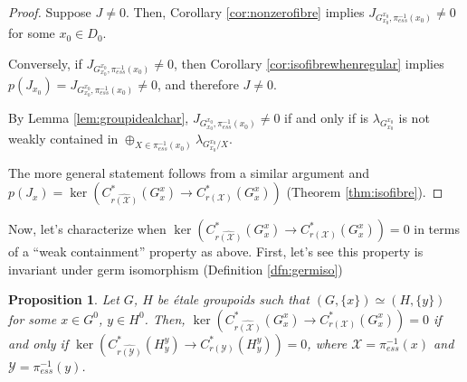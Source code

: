 \documentclass[a4paper, 12pt]{amsart}
\newtheorem{prp}[thm]{Proposition}
\theoremstyle{definition}
\theoremstyle{remark}
\numberwithin{equation}{section}
\begin{document}
\begin{proof}
Suppose $J\neq 0$. Then, Corollary \ref{cor:nonzerofibre} implies $J_{G^{x_{0}}_{x_{0}}, \pi^{-1}_{ess}(x_{0})}\neq 0$ for some $x_{0}\in D_{0}$. 

Conversely, if $J_{G^{x_{0}}_{x_{0}}, \pi^{-1}_{ess}(x_{0})}\neq 0$, then Corollary \ref{cor:isofibrewhenregular} implies $p(J_{x_{0}}) = J_{G^{x_{0}}_{x_{0}}, \pi^{-1}_{ess}(x_{0})}\neq 0$, and therefore $J\neq 0$.

By Lemma \ref{lem:groupidealchar}, $J_{G^{x_{0}}_{x_{0}}, \pi^{-1}_{ess}(x_{0})}\neq 0$ if and only if is $\lambda_{G_{x_{0}}^{x_{0}}}$ is not weakly contained in $\oplus_{X\in \pi^{-1}_{ess}(x_{0})}\lambda_{G^{x_{0}}_{x_{0}}/X}$.

The more general statement follows from a similar argument and $p(J_{x}) = \ker(C^{*}_{\widehat{r(\mathcal{X})}}(G^{x}_{x})\to C^{*}_{r(\mathcal{X})}(G^{x}_{x}))$ (Theorem \ref{thm:isofibre}).
\end{proof}

Now, let's characterize when $\ker(C^{*}_{\widehat{r(\mathcal{X})}}(G^{x}_{x})\to C^{*}_{r(\mathcal{X})}(G^{x}_{x})) = 0$ in terms of a ``weak containment'' property as above. First, let's see this property is invariant under germ isomorphism (Definition \ref{dfn:germiso})

\begin{prp}
\label{prp:dependsongerm}
    Let $G$, $H$ be \'etale groupoids such that $(G, \{x\})\simeq (H, \{y\})$ for some $x\in G^{0}$, $y\in H^{0}$. Then, $\ker(C^{*}_{\widehat{r(\mathcal{X})}}(G^{x}_{x})\to C^{*}_{r(\mathcal{X})}(G^{x}_{x})) = 0$ if and only if $\ker(C^{*}_{\widehat{r(\mathcal{Y})}}(H^{y}_{y})\to C^{*}_{r(\mathcal{Y})}(H^{y}_{y})) = 0$, where $\mathcal{X} = \pi^{-1}_{ess}(x)$ and $\mathcal{Y} = \pi^{-1}_{ess}(y)$.
\end{prp}
\end{document}
